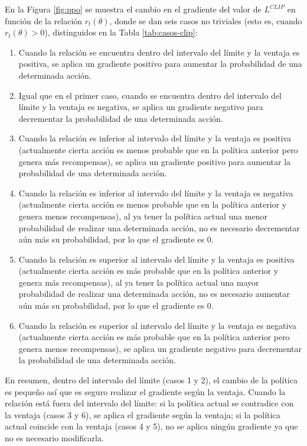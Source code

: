 En la Figura \ref{fig:ppo} se muestra el cambio en el gradiente del valor de $L^{CLIP}$ en función de la relación $r_t(\theta)$, donde se dan seis casos no triviales (esto es, cuando $r_t(\theta) > 0$), distinguidos en la Tabla \ref{tab:casos-clip}:
\begin{enumerate}
    \item Cuando la relación se encuentra dentro del intervalo del límite y la ventaja es positiva, se aplica un gradiente positivo para aumentar la probabilidad de una determinada acción.
    \item Igual que en el primer caso, cuando se encuentra dentro del intervalo del límite y la ventaja es negativa, se aplica un gradiente negativo para decrementar la probabilidad de una determinada acción.
    \item Cuando la relación es inferior al intervalo del límite y la ventaja es positiva (actualmente cierta acción es menos probable que en la política anterior pero genera más recompensas), se aplica un gradiente positivo para aumentar la probabilidad de una determinada acción.
    \item Cuando la relación es inferior al intervalo del límite y la ventaja es negativa (actualmente cierta acción es menos probable que en la política anterior y genera menos recompensas), al ya tener la política actual una menor probabilidad de realizar una determinada acción, no es necesario decrementar aún más su probabilidad, por lo que el gradiente es 0.
    \item Cuando la relación es superior al intervalo del límite y la ventaja es positiva (actualmente cierta acción es más probable que en la política anterior y genera más recompensas), al ya tener la política actual una mayor probabilidad de realizar una determinada acción, no es necesario aumentar aún más su probabilidad, por lo que el gradiente es 0.
    \item Cuando la relación es superior al intervalo del límite y la ventaja es negativa (actualmente cierta acción es más probable que en la política anterior pero genera menos recompensas), se aplica un gradiente negativo para decrementar la probabilidad de una determinada acción.
\end{enumerate}
En resumen, dentro del intervalo del límite (casos 1 y 2), el cambio de la política es pequeño así que es seguro realizar el gradiente según la ventaja. Cuando la relación está fuera del intervalo del límite: si la política actual se contradice con la ventaja (casos 3 y 6), se aplica el gradiente según la ventaja; si la política actual coincide con la ventaja (casos 4 y 5), no se aplica ningún gradiente ya que no es necesario modificarla.

